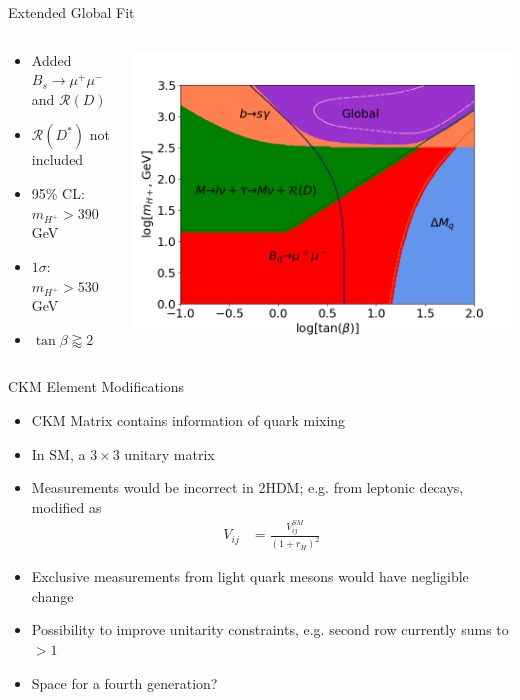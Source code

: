 \documentclass[10pt,xcolor={table,dvipsnames},t]{beamer}
\begin{document}
\begin{frame}{Extended Global Fit}
    \begin{columns}[T]
        \begin{column}{0.37\textwidth}
            \vspace{1.5em}
            \begin{itemize}
                \item Added $B_s\to\mu^+\mu^-$ and $\mathcal{R}(D)$
                \item $\mathcal{R}(D^*)$ not included
                \item 95\% CL: $m_{H^+}>390\,$GeV
                \item $1\sigma$: $m_{H^+}>530\,$GeV
                \item $\tan\beta\gtrapprox2$
            \end{itemize}
        \end{column}
        \begin{column}{0.60\textwidth}
            \includegraphics[scale=0.35]{global_lines.png}
        \end{column}
    \end{columns}
\end{frame}

\begin{frame}{CKM Element Modifications}
    \begin{itemize}
        \item CKM Matrix contains information of quark mixing 
        \item In SM, a $3\times3$ unitary matrix
        \item Measurements would be incorrect in 2HDM; e.g. from leptonic decays, modified as
            \begin{align*}
                V_{ij} &= \frac{V_{ij}^{SM}}{(1+r_H)^2}
            \end{align*}
        \item Exclusive measurements from light quark mesons would have negligible change
        \item Possibility to improve unitarity constraints, e.g. second row currently sums to $>1$
        \item Space for a fourth generation? %
    \end{itemize}
\end{frame}
\end{document}
